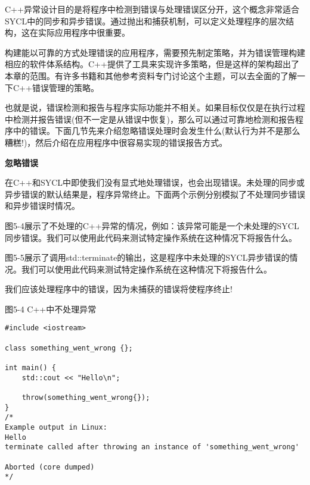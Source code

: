 C++异常设计目的是将程序中检测到错误与处理错误区分开，这个概念非常适合SYCL中的同步和异步错误。通过抛出和捕获机制，可以定义处理程序的层次结构，这在实际应用程序中很重要。\par

构建能以可靠的方式处理错误的应用程序，需要预先制定策略，并为错误管理构建相应的软件体系结构。C++提供了工具来实现许多策略，但是这样的架构超出了本章的范围。有许多书籍和其他参考资料专门讨论这个主题，可以去全面的了解一下C++错误管理的策略。\par

也就是说，错误检测和报告与程序实际功能并不相关。如果目标仅仅是在执行过程中检测并报告错误(但不一定是从错误中恢复)，那么可以通过可靠地检测和报告程序中的错误。下面几节先来介绍忽略错误处理时会发生什么(默认行为并不是那么糟糕!)，然后介绍在应用程序中很容易实现的错误报告方式。\par

\hspace*{\fill} \par %
\textbf{忽略错误}

在C++和SYCL中即使我们没有显式地处理错误，也会出现错误。未处理的同步或异步错误的默认结果是，程序异常终止。下面两个示例分别模拟了不处理同步错误和异步错误时情况。\par

图5-4展示了不处理的C++异常的情况，例如：该异常可能是一个未处理的SYCL同步错误。我们可以使用此代码来测试特定操作系统在这种情况下将报告什么。\par

图5-5展示了调用std::terminate的输出，这是程序中未处理的SYCL异步错误的情况。我们可以使用此代码来测试特定操作系统在这种情况下将报告什么。\par

我们应该处理程序中的错误，因为未捕获的错误将使程序终止!\par

\hspace*{\fill} \par %
图5-4 C++中不处理异常
\begin{lstlisting}[caption={}]
#include <iostream>

class something_went_wrong {};

int main() {
	std::cout << "Hello\n";
	
	throw(something_went_wrong{});
}
/*
Example output in Linux:
Hello
terminate called after throwing an instance of 'something_went_wrong'

Aborted (core dumped)
*/
\end{lstlisting}

